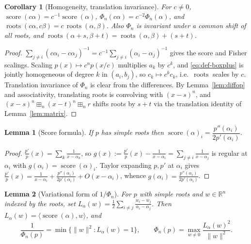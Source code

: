 \documentclass[12pt]{article}
\newtheorem{lemma}{Lemma}
\newtheorem{corollary}{Corollary}
\theoremstyle{definition}
\DeclareMathOperator{\roots}{roots}
\DeclareMathOperator{\score}{score}
\newcommand{\bR}{\mathbb{R}}
\newcommand{\boxp}{\boxplus_n}
\begin{document}
\begin{corollary}[Homogeneity, translation invariance]\label{cor:homog}
For $c\ne0$, $\score(c\alpha)=c^{-1}\score(\alpha)$, $\Phi_n(c\alpha)=c^{-2}\Phi_n(\alpha)$,
and $\roots(c\alpha,c\beta)=c\,\roots(\alpha,\beta)$. Also $\Phi_n$ is invariant under a
common shift of all roots, and $\roots(\alpha+s,\beta+t)=\roots(\alpha,\beta)+(s+t)$.
\end{corollary}

\begin{proof}
$\sum_{j\ne i}(c\alpha_i-c\alpha_j)^{-1}=c^{-1}\sum_{j\ne i}(\alpha_i-\alpha_j)^{-1}$ gives
the score and Fisher scalings. Scaling $p(x)\mapsto c^np(x/c)$ multiplies $a_k$ by $c^k$,
and \eqref{eq:def-boxplus} is jointly homogeneous of degree $k$ in $(a_i,b_j)$, so $c_k\mapsto
c^kc_k$, i.e.\ $\roots$ scales by $c$. Translation invariance of $\Phi_n$ is clear from the
differences. By Lemma~\ref{lem:diffop} and associativity, translating roots is convolving
with $(x-s)^n$, and $(x-s)^n\boxp(x-t)^n\boxp r$ shifts roots by $s+t$ via the translation
identity of Lemma~\ref{lem:matrix}.
\end{proof}

\begin{lemma}[Score formula]\label{lem:scoreformula}
If $p$ has simple roots then $\score(\alpha)_i=\dfrac{p''(\alpha_i)}{2p'(\alpha_i)}$.
\end{lemma}

\begin{proof}
$\frac{p'}{p}(x)=\sum_k\frac1{x-\alpha_k}$, so
$g(x):=\frac{p'}{p}(x)-\frac1{x-\alpha_i}=\sum_{j\ne i}\frac1{x-\alpha_j}$ is regular at
$\alpha_i$ with $g(\alpha_i)=\score(\alpha)_i$. Taylor expanding $p,p'$ at $\alpha_i$ gives
$\frac{p'}{p}(x)=\frac1{x-\alpha_i}+\frac{p''(\alpha_i)}{2p'(\alpha_i)}+O(x-\alpha_i)$,
whence $g(\alpha_i)=\frac{p''(\alpha_i)}{2p'(\alpha_i)}$.
\end{proof}

\begin{lemma}[Variational form of $1/\Phi_n$]\label{lem:variational}
For $p$ with simple roots and $w\in\bR^n$ indexed by the roots, set
$L_\alpha(w)=\tfrac12\sum_{i\ne j}\frac{w_i-w_j}{\alpha_i-\alpha_j}$. Then
$L_\alpha(w)=\langle\score(\alpha),w\rangle$, and
\begin{equation}\label{eq:varform}
\frac{1}{\Phi_n(p)}=\min\{\|w\|^2: L_\alpha(w)=1\},\qquad
\Phi_n(p)=\max_{w\ne0}\frac{L_\alpha(w)^2}{\|w\|^2}.
\end{equation}
\end{lemma}
\end{document}
